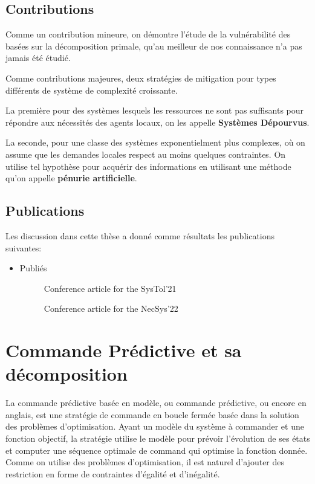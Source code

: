 \documentclass[../main.tex]{subfiles}
\begin{document}
\subsection{Contributions}
Comme un contribution mineure, on démontre l'étude de la vulnérabilité des \dmpc{} basées sur la décomposition primale, qu'au meilleur de nos connaissance n'a pas jamais été étudié.

Comme contributions majeures, deux stratégies de mitigation pour types différents de système de complexité croissante.

La première pour des systèmes lesquels les ressources ne sont pas suffisants pour répondre aux nécessités des agents locaux, on les appelle \textbf{Systèmes Dépourvus}.

La seconde, pour une classe des systèmes exponentielment plus complexes, où on assume que les demandes locales respect au moins quelques contraintes. On utilise tel hypothèse pour acquérir des informations en utilisant une méthode qu'on appelle \textbf{pénurie artificielle}.

\subsection{Publications}
Les discussion dans cette thèse a donné comme résultats les publications suivantes:
\begin{itemize}
  \item Publiés
        \begin{description}
          \item[\cite{NogueiraEtAl2021}] Conference article for the SysTol'21
          \item[\cite{NogueiraEtAl2022}] Conference article for the NecSys'22
        \end{description}
\end{itemize}

\newpage
\section{Commande Prédictive et sa décomposition}\label{sec:comm-pred-et}

La commande prédictive basée en modèle, ou commande prédictive, ou encore \mpclong{} en anglais, est une stratégie de commande en boucle fermée basée dans la solution des problèmes d'optimisation.
Ayant un modèle du système à commander et une fonction objectif, la stratégie utilise le modèle pour prévoir l'évolution de ses états et computer une séquence optimale de command qui optimise la fonction donnée.
Comme on utilise des problèmes d'optimisation, il est naturel d'ajouter des restriction en forme de contraintes d'égalité et d'inégalité.
\end{document}
